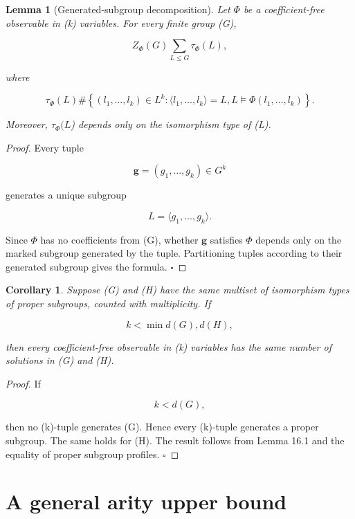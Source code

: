 \documentclass[11pt]{article}
\newtheorem{lemma}[theorem]{Lemma}
\newtheorem{corollary}[theorem]{Corollary}
\begin{document}
\begin{lemma}[Generated-subgroup decomposition]
Let $\Phi$ be a coefficient-free observable in (k) variables. For every finite group (G),

\[
Z_\Phi(G)
\sum_{L\le G}\tau_\Phi(L),
\]

where

\[
\tau_\Phi(L)
\#\left\{
(l_1,\dots,l_k)\in L^k:
\langle l_1,\dots,l_k\rangle=L,
L\models \Phi(l_1,\dots,l_k)
\right\}.
\]

Moreover, $\tau_\Phi(L$) depends only on the isomorphism type of (L).

\end{lemma}

\begin{proof}
Every tuple

\[
\mathbf g=(g_1,\dots,g_k)\in G^k
\]

generates a unique subgroup

\[
L=\langle g_1,\dots,g_k\rangle.
\]

Since $\Phi$ has no coefficients from (G), whether $\mathbf g$ satisfies $\Phi$ depends only on the marked subgroup generated by the tuple. Partitioning tuples according to their generated subgroup gives the formula. $\square$

\end{proof}

\begin{corollary}
Suppose (G) and (H) have the same multiset of isomorphism types of proper subgroups, counted with multiplicity. If

\[
k<\min{d(G),d(H)},
\]

then every coefficient-free observable in (k) variables has the same number of solutions in (G) and (H).

\end{corollary}

\begin{proof}
If

\[
k<d(G),
\]

then no (k)-tuple generates (G). Hence every (k)-tuple generates a proper subgroup. The same holds for (H). The result follows from Lemma 16.1 and the equality of proper subgroup profiles. $\square$

\end{proof}

\section{A general arity upper bound}
\end{document}
